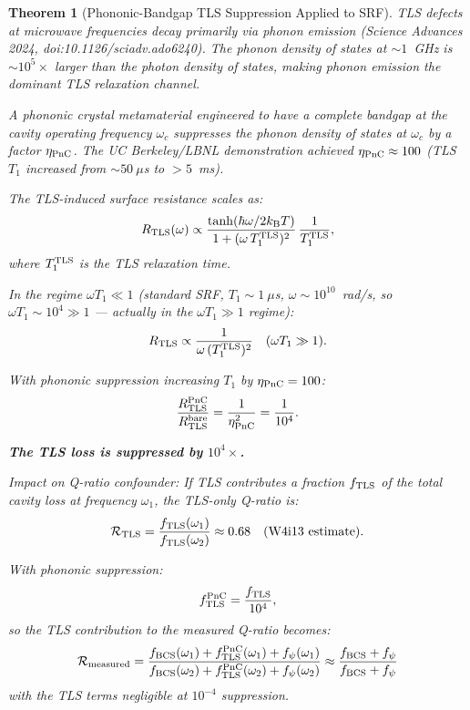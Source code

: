 \documentclass[11pt]{article}
\newcommand{\kB}{k_{\mathrm{B}}}
\newtheorem{theorem}{Theorem}[section]
\theoremstyle{definition}
\theoremstyle{remark}
\begin{document}
\begin{theorem}[Phononic-Bandgap TLS Suppression Applied to SRF]
\label{thm:phononic_TLS}
TLS defects at microwave frequencies decay primarily via phonon
emission (Science Advances 2024, doi:10.1126/sciadv.ado6240). The
phonon density of states at $\sim 1$~GHz is $\sim 10^5 \times$ larger
than the photon density of states, making phonon emission the dominant
TLS relaxation channel.

A phononic crystal metamaterial engineered to have a complete bandgap
at the cavity operating frequency $\omega_c$ suppresses the phonon
density of states at $\omega_c$ by a factor $\eta_{\rm PnC}$. The
UC Berkeley/LBNL demonstration achieved $\eta_{\rm PnC} \approx 100$
(TLS $T_1$ increased from $\sim 50~\mu$s to $> 5$~ms).

The TLS-induced surface resistance scales as:
\begin{equation}
R_{\rm TLS}(\omega) \propto \frac{\tanh(\hbar\omega/2\kB T)}
{1 + (\omega\,T_1^{\rm TLS})^2}\,\frac{1}{T_1^{\rm TLS}},
\label{eq:R_TLS}
\end{equation}
where $T_1^{\rm TLS}$ is the TLS relaxation time.

In the regime $\omega T_1 \ll 1$ (standard SRF, $T_1 \sim 1~\mu$s,
$\omega \sim 10^{10}$~rad/s, so $\omega T_1 \sim 10^4 \gg 1$ ---
actually in the $\omega T_1 \gg 1$ regime):
\begin{equation}
R_{\rm TLS} \propto \frac{1}{\omega\,(T_1^{\rm TLS})^2}
\quad (\omega T_1 \gg 1).
\label{eq:R_TLS_high_freq}
\end{equation}

With phononic suppression increasing $T_1$ by $\eta_{\rm PnC} = 100$:
\begin{equation}
\frac{R_{\rm TLS}^{\rm PnC}}{R_{\rm TLS}^{\rm bare}}
= \frac{1}{\eta_{\rm PnC}^2} = \frac{1}{10^4}.
\label{eq:TLS_suppression}
\end{equation}

\textbf{The TLS loss is suppressed by $10^4\times$.}

Impact on Q-ratio confounder: If TLS contributes a fraction $f_{\rm TLS}$
of the total cavity loss at frequency $\omega_1$, the TLS-only Q-ratio is:
\begin{equation}
\mathcal{R}_{\rm TLS} = \frac{f_{\rm TLS}(\omega_1)}
{f_{\rm TLS}(\omega_2)} \approx 0.68 \quad \text{(W4i13 estimate)}.
\end{equation}

With phononic suppression:
\begin{equation}
f_{\rm TLS}^{\rm PnC} = \frac{f_{\rm TLS}}{10^4},
\end{equation}
so the TLS contribution to the measured Q-ratio becomes:
\begin{equation}
\mathcal{R}_{\rm measured} = \frac{f_{\rm BCS}(\omega_1) +
f_{\rm TLS}^{\rm PnC}(\omega_1) + f_\psi(\omega_1)}
{f_{\rm BCS}(\omega_2) + f_{\rm TLS}^{\rm PnC}(\omega_2)
+ f_\psi(\omega_2)}
\approx \frac{f_{\rm BCS} + f_\psi}{f_{\rm BCS} + f_\psi}
\end{equation}
with the TLS terms negligible at $10^{-4}$ suppression.


\end{theorem}
\end{document}
